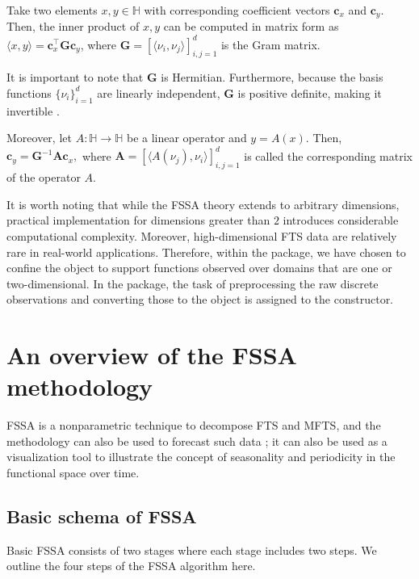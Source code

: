 Take two elements $x, y\in \mathbb{H}$ with corresponding coefficient vectors ${\pmb c}_x$ and ${\pmb c}_y.$ Then, the inner product of $x, y$ can be computed in matrix form as $\langle x,y \rangle={\pmb c}_x^\top \mathbf{G} {\pmb c}_y$, where $\mathbf{G}=[ \langle \nu_i,\nu_j \rangle ]_{i,j=1}^{d}$ is the Gram matrix.

It is important to note that $\mathbf{G}$ is Hermitian. Furthermore, because the basis functions $\{\nu_i\}_{i=1}^d$ are linearly independent, $\mathbf{G}$ is positive definite, making it invertible \citep[][Thm. 7.2.10]{horn2012matrix}.

Moreover, let $A:\mathbb{H}\rightarrow \mathbb{H}$ be a linear operator and $y=A(x).$ Then, ${\pmb c}_y= \mathbf{G}^{-1}\mathbf{A}{\pmb c}_x,$ where $\mathbf{A}=[ \langle A(\nu_j),\nu_i \rangle ]_{i,j=1}^{d}$ is called the corresponding matrix of the operator $A.$

It is worth noting that while the FSSA theory extends to arbitrary dimensions, practical implementation for dimensions greater than $2$ introduces considerable computational complexity. Moreover, high-dimensional FTS data are relatively rare in real-world applications. Therefore, within the  package, we have chosen to confine the  object to support functions observed over domains that are one or two-dimensional. In the  package, the task of preprocessing the raw discrete observations and converting those to the  object is assigned to the  constructor.

\section{An overview of the FSSA methodology}\label{sec:methodology}

FSSA is a nonparametric technique to decompose FTS and MFTS, and the methodology can also be used to forecast such data \citep{haghbin2021, trinka2022multivariate, trinka2023functional}; it can also be used as a visualization tool to illustrate the concept of seasonality and periodicity in the functional space over time.

\subsection{Basic schema of FSSA}

Basic FSSA consists of two stages where each stage includes two steps. We outline the four steps of the FSSA algorithm here.

